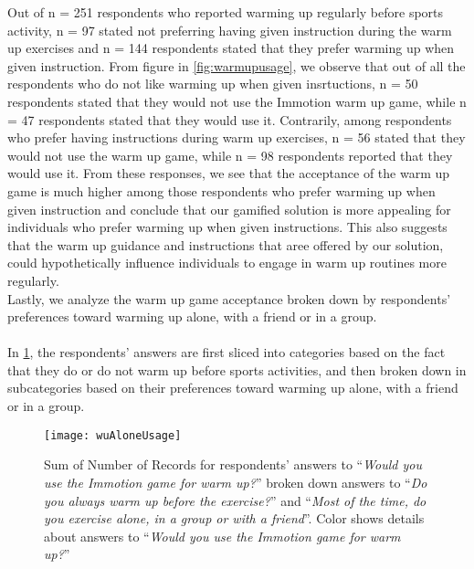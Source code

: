 Out of n = 251 respondents who reported warming up regularly before sports activity, n = 97 stated not preferring having given instruction during the warm up exercises and n = 144 respondents stated that they prefer warming up when given instruction. From figure in \ref{fig:warmupusage}, we observe that out of all the respondents who do not like warming up when given insrtuctions, n = 50 respondents stated that they would not use the Immotion warm up game, while n = 47 respondents stated that they would use it. Contrarily, among respondents who prefer having instructions during warm up exercises, n = 56 stated that they would not use the warm up game, while n = 98 respondents reported that they would use it. From these responses, we see that the acceptance of the warm up game is much higher among those respondents who prefer warming up when given instruction and conclude that our gamified solution is more appealing for individuals who prefer warming up when given instructions. This also suggests that the warm up guidance and instructions that aree offered by our solution, could hypothetically influence individuals to engage in warm up routines more regularly.\\ Lastly, we analyze the warm up game acceptance broken down by respondents' preferences toward warming up alone, with a friend or in a group.\\\\
In \ref{fig:wuAloneUsage}, the respondents' answers are first sliced into categories based on the fact that they do or do not warm up before sports activities, and then broken down in subcategories based on their preferences toward warming up alone, with a friend or in a group.
\begin{figure}[h]
    \centering
    \texttt{[image: wuAloneUsage]}
    \caption{Sum of Number of Records for respondents' answers to ``\textit{Would you use the Immotion game for warm up?}'' broken down answers to ``\textit{Do you always warm up before the exercise?}'' and ``\textit{Most of the time, do you exercise alone, in a group or with a friend}''. Color shows details about answers to ``\textit{Would you use the Immotion game for warm up?}''}
    \label{fig:wuAloneUsage}
\end{figure}\\
